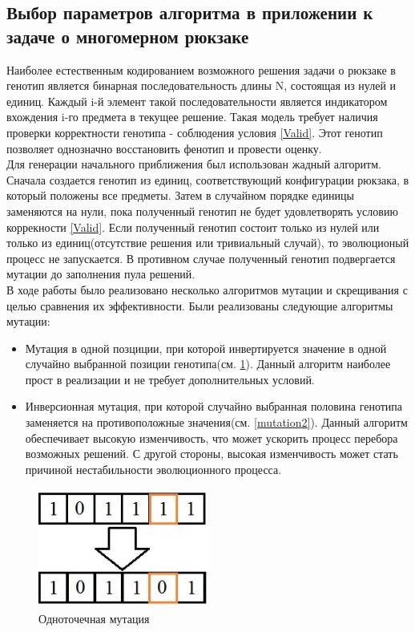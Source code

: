 \subsection{Выбор параметров алгоритма в приложении к\\ задаче о многомерном рюкзаке}
Наиболее естественным кодированием возможного решения задачи о рюкзаке в генотип является бинарная последовательность длины N, состоящая из нулей и единиц.
Каждый i-й элемент такой последовательности является индикатором вхождения i-го предмета в текущее решение. Такая модель требует наличия проверки корректности генотипа - соблюдения условия \ref{Valid}. Этот генотип позволяет однозначно восстановить фенотип и провести оценку.
\\ Для генерации начального приближения был использован жадный алгоритм. Сначала создается генотип из единиц, соответствующий конфигурации рюкзака, в который положены все предметы. Затем в случайном порядке единицы заменяются на нули, пока полученный генотип не будет удовлетворять условию коррекности \ref{Valid}. Если полученный генотип состоит только из нулей или только из единиц(отсутствие решения или тривиальный случай), то эволюционый процесс не запускается. 
В противном случае полученный генотип подвергается мутации до заполнения пула решений.
\\ В ходе работы было реализовано несколько алгоритмов мутации и скрещивания с целью сравнения их эффективности. Были реализованы следующие алгоритмы мутации:
\begin{itemize}
	\item Мутация в одной позциции, при которой инвертируется значение в одной случайно выбранной позиции генотипа(см. \ref{mutation1}). Данный алгоритм наиболее прост в реализации и не требует дополнительных условий.
	\item Инверсионная мутация, при которой случайно выбранная половина генотипа заменяется на противоположные значения(см. \ref{mutation2}). Данный алгоритм обеспечивает высокую изменчивость, что может ускорить процесс перебора возможных решений. С другой стороны, высокая изменчивость может стать причиной нестабильности эволюционного процесса. 
\end{itemize}
\FloatBarrier
	\begin{figure}[htbp]	
	\includegraphics[width=0.5\textwidth]{./Pics/1.jpg}
	\caption{Одноточечная мутация}
	\label{mutation1}
	\end{figure}	

